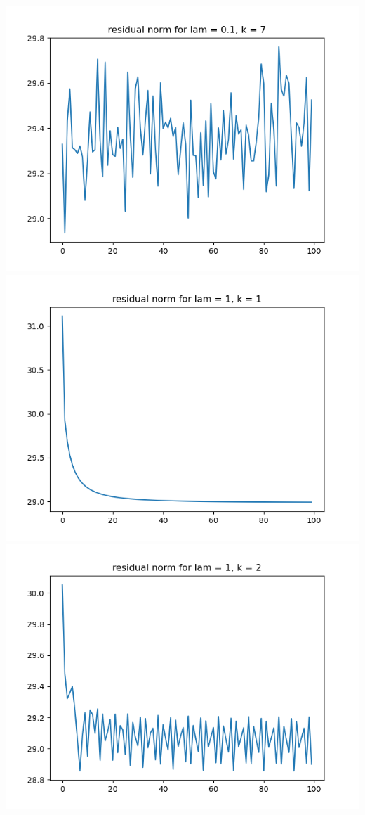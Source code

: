 \documentclass{article}
\begin{document}
\begin{enumerate}
\begin{enumerate}
\begin{center}
			\includegraphics[scale=.3]{hw7p1 residual norm for lamcount = 1, k = 7}
			\includegraphics[scale=.3]{hw7p1 residual norm for lamcount = 2, k = 1}
			\includegraphics[scale=.3]{hw7p1 residual norm for lamcount = 2, k = 2}

\end{center}
\end{enumerate}
\end{enumerate}
\end{document}

